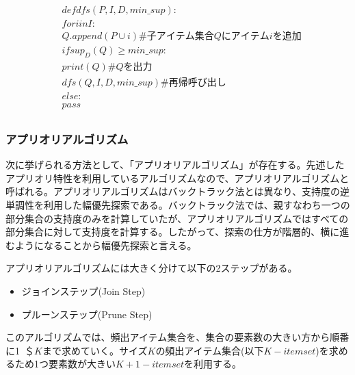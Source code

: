 \documentclass[dvipdfmx]{jsarticle}
\begin{document}
\begin{align*}
  &def　dfs(P, I, D, min\_sup): \\
  &　for　i　in　I: \\
  &　　Q.append(P\cup i) \#子アイテム集合Qにアイテムiを追加 \\
  &　　if　sup_{D}(Q) \geq min\_sup: \\
  &　　　print(Q)　\#Qを出力 \\
  &　　　dfs(Q, I, D, min\_sup)　\#再帰呼び出し\\
  &　　else: \\
  &　　　pass \\
\end{align*}
\subsubsection{アプリオリアルゴリズム}
次に挙げられる方法として、「アプリオリアルゴリズム」が存在する。先述したアプリオリ特性を利用しているアルゴリズムなので、アプリオリアルゴリズムと呼ばれる。アプリオリアルゴリズムはバックトラック法とは異なり、支持度の逆単調性を利用した幅優先探索である。バックトラック法では、親すなわち一つの部分集合の支持度のみを計算していたが、アプリオリアルゴリズムではすべての部分集合に対して支持度を計算する。したがって、探索の仕方が階層的、横に進むようになることから幅優先探索と言える。\par
アプリオリアルゴリズムには大きく分けて以下の2ステップがある。
\begin{itemize}
  \item ジョインステップ(Join Step)
  \item プルーンステップ(Prune Step)
\end{itemize}
このアルゴリズムでは、頻出アイテム集合を、集合の要素数の大きい方から順番に1~＄$K$まで求めていく。サイズ$K$の頻出アイテム集合(以下$K-itemset$)を求めるため1つ要素数が大きい$K+1-itemset$を利用する。
\end{document}
